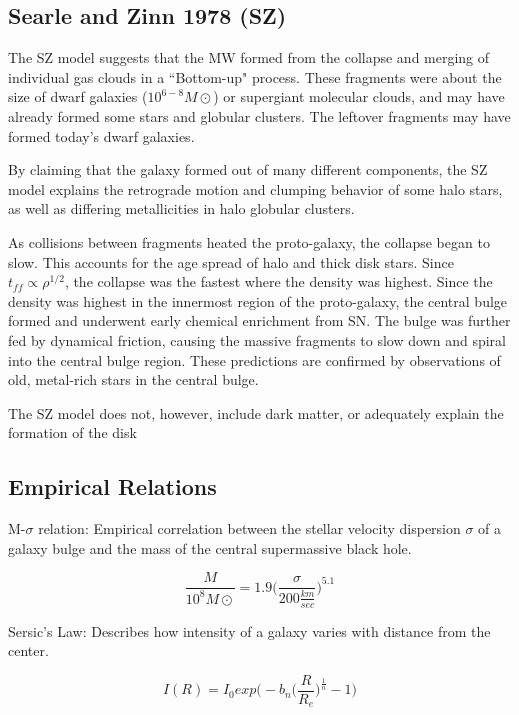 \subsection{Searle and Zinn 1978 (SZ)}

The SZ model suggests that the MW formed from the collapse and merging of individual gas clouds in a ``Bottom-up" process. These fragments were about the size of dwarf galaxies ($10^{6-8} M\odot$) or supergiant molecular clouds, and may have already formed some stars and globular clusters. The leftover fragments may have formed today's dwarf galaxies. 

By claiming that the galaxy formed out of many different components, the SZ model explains the retrograde motion and clumping behavior of some halo stars, as well as differing metallicities in halo globular clusters. 

As collisions between fragments heated the proto-galaxy, the collapse began to slow. This accounts for the age spread of halo and thick disk stars. Since $t_{ff} \propto \rho^{1/2}$, the collapse was the fastest where the density was highest. Since the density was highest in the innermost region of the proto-galaxy, the central bulge formed and underwent early chemical enrichment from SN. The bulge was further fed by dynamical friction, causing the massive fragments to slow down and spiral into the central bulge region. These predictions are confirmed by observations of old, metal-rich stars in the central bulge. 

The SZ model does not, however, include dark matter, or adequately explain the formation of the disk 

\subsection{Empirical Relations}

M-$\sigma$ relation:  Empirical correlation between the stellar velocity dispersion $\sigma$ of a galaxy bulge and the mass of the central supermassive black hole.

\begin{equation}
\frac{M}{10^8M\odot} = 1.9\bigg(\frac{\sigma}{200 \frac{km}{sec}}\bigg)^{5.1}
\end{equation}

Sersic's Law:  Describes how intensity of a galaxy varies with distance from the center.  

\begin{equation}
I(R) = I_0exp\bigg(-b_n\bigg(\frac{R}{R_e}\bigg)^{\frac{1}{n}} - 1\bigg)
\end{equation}

